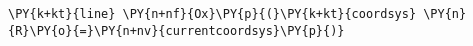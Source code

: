 \begin{Verbatim}[commandchars=\\\{\}]
    \PY{k+kt}{line} \PY{n+nf}{Ox}\PY{p}{(}\PY{k+kt}{coordsys} \PY{n}{R}\PY{o}{=}\PY{n+nv}{currentcoordsys}\PY{p}{)}
\end{Verbatim}
